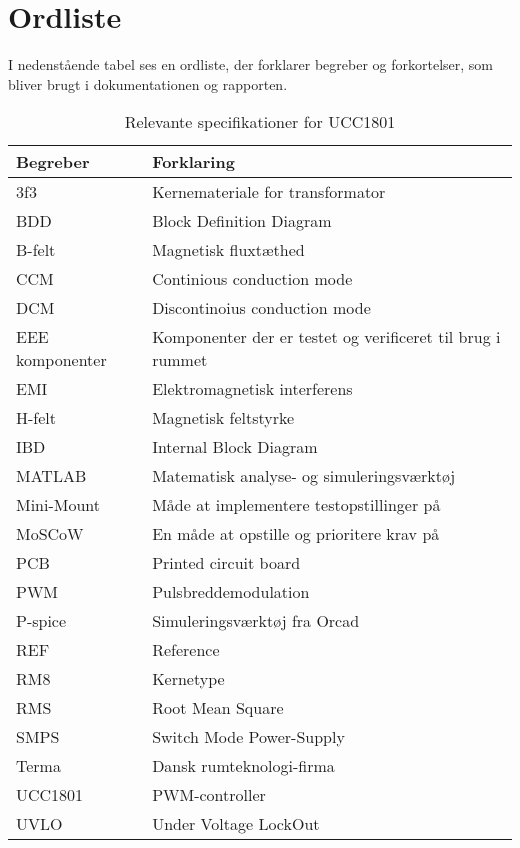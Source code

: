 \section{Ordliste}
I nedenstående tabel ses en ordliste, der forklarer begreber og forkortelser, som bliver brugt i dokumentationen og rapporten.
\begin{table}[H] 			
	\centering
	\begin{tabularx}{\textwidth}{|X|l|} 
		\hline
		\textbf{Begreber} & \textbf{Forklaring} \\ \hline
		3f3 & Kernemateriale for transformator \\ \hline
		BDD & Block Definition Diagram \\ \hline
		B-felt & Magnetisk fluxtæthed \\ \hline
		CCM & Continious conduction mode \\ \hline
		DCM & Discontinoius conduction mode \\ \hline
		EEE komponenter & Komponenter der er testet og verificeret til brug i rummet \\ \hline
		EMI & Elektromagnetisk interferens \\ \hline
		H-felt & Magnetisk feltstyrke \\ \hline
		IBD & Internal Block Diagram \\ \hline
		MATLAB & Matematisk analyse- og simuleringsværktøj \\ \hline
		Mini-Mount & Måde at implementere testopstillinger på \\ \hline
		MoSCoW & En måde at opstille og prioritere krav på \\ \hline
		PCB & Printed circuit board \\ \hline
		PWM & Pulsbreddemodulation \\ \hline
		P-spice & Simuleringsværktøj fra Orcad \\ \hline
		REF & Reference \\ \hline
		RM8 & Kernetype \\ \hline
		RMS & Root Mean Square \\ \hline
		SMPS & Switch Mode Power-Supply \\ \hline
		Terma & Dansk rumteknologi-firma  \\ \hline
		UCC1801 & PWM-controller \\ \hline
		UVLO & Under Voltage LockOut \\ \hline
	\end{tabularx}
	
	\caption{Relevante specifikationer for UCC1801}
	\label{tab:ucc1801_specs}
\end{table}

